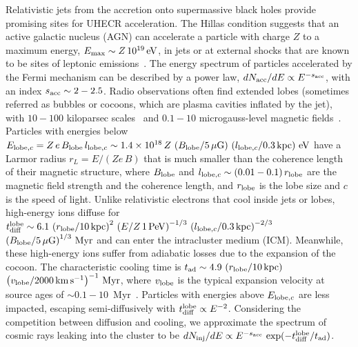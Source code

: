 \documentclass[aps,prd,onecolumn,superscriptaddress,11pt]{revtex4}
\begin{document}
Relativistic jets from the accretion onto supermassive black holes provide promising sites for UHECR acceleration. The Hillas condition suggests that an active galactic nucleus (AGN) can accelerate a particle with charge $Z$ to a maximum energy, $E_{\rm max}\sim Z\,10^{19}\,\rm eV$, in jets or at external shocks that are known to be sites of leptonic emissions~\cite{Hillas84,2012ApJ...749...63M}. 
The energy spectrum of particles accelerated by the Fermi mechanism can be described by a power law, $dN_{\rm acc}/dE\propto E^{-s_{\rm acc}}$, with an index $s_{\rm acc}\sim2-2.5$.
Radio observations often find extended lobes (sometimes referred as bubbles or cocoons, which are plasma cavities inflated by the jet), with $10-100$ kiloparsec scales~\cite{2007MNRAS.381.1548K} and $0.1-10$ microgauss-level magnetic fields~\cite{2005ApJ...622..797K}.  
Particles with energies below $E_{{\rm lobe},c} = Z\,e\,B_{\rm lobe}\,l_{{\rm lobe},c}\sim1.4\times{10}^{18}\,Z\,\left(B_{\rm lobe}/5\,\mu\rm G\right)\,\left(l_{{\rm lobe},c}/0.3\,\rm kpc\right)\,\rm eV$ have a Larmor radius $r_L =E/(Ze\,B)$ that is much smaller than the coherence length of their magnetic structure, where $B_{\rm lobe}$ and $l_{{\rm lobe},c}\sim(0.01-0.1)\,r_{\rm lobe}$ are the magnetic field strength and the coherence length, and $r_{\rm lobe}$ is the lobe size and $c$ is the speed of light. Unlike relativistic electrons that cool inside jets or lobes, high-energy ions diffuse for $t_{\rm diff}^{\rm lobe} \sim6.1\,\left( {r_{\rm lobe}}/{10\,\rm kpc}\right)^2\, \left({E}/{Z\,1\,\rm PeV}\right)^{-1/3}\,\left({l_{{\rm lobe},c}}/{0.3\,\rm kpc}\right)^{-2/3}$ $\left({B_{\rm lobe}}/{5\,\mu \rm G}\right)^{1/3}\,{\rm Myr}$ and can enter the intracluster medium (ICM). Meanwhile, these high-energy ions suffer from adiabatic losses due to the expansion of the cocoon. The characteristic cooling time is $t_{\rm ad}\sim4.9\,\left(r_{\rm lobe}/10\,\rm kpc\right)$ $\left(v_{\rm lobe}/2000\,\rm km\,s^{-1}\right)^{-1}\,\rm Myr$, where $v_{\rm lobe}$ is the typical expansion velocity at source ages of $\sim0.1-10$~Myr~\cite{2011MNRAS.412.1229B}. Particles with energies above $E_{{\rm lobe},c}$ are less impacted, escaping semi-diffusively with $t_{\rm diff}^{\rm lobe}\propto E^{-2}$. Considering the competition between diffusion and cooling, we approximate the spectrum of cosmic rays leaking into the cluster to be $dN_{\rm inj}/dE\propto E^{-s_{\rm acc}}\,\exp(-t_{\rm diff}^{\rm lobe}/t_{\rm ad})$.
\end{document}
